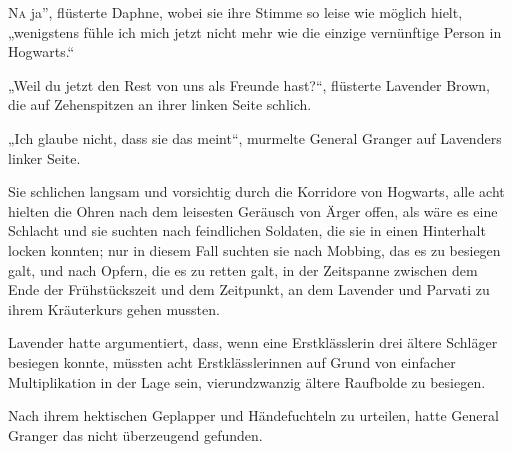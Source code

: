
\lettrine[ante=„]{N}{a} ja”, flüsterte Daphne, wobei sie ihre Stimme so leise wie möglich hielt, „wenigstens fühle ich mich jetzt nicht mehr wie die einzige vernünftige Person in Hogwarts.“

„Weil du jetzt den Rest von uns als Freunde hast?“, flüsterte Lavender Brown, die auf Zehenspitzen an ihrer linken Seite schlich.

„Ich glaube nicht, dass sie das meint“, murmelte General Granger auf Lavenders linker Seite.

Sie schlichen langsam und vorsichtig durch die Korridore von Hogwarts, alle acht hielten die Ohren nach dem leisesten Geräusch von Ärger offen, als wäre es eine Schlacht und sie suchten nach feindlichen Soldaten, die sie in einen Hinterhalt locken konnten; nur in diesem Fall suchten sie nach Mobbing, das es zu besiegen galt, und nach Opfern, die es zu retten galt, in der Zeitspanne zwischen dem Ende der Frühstückszeit und dem Zeitpunkt, an dem Lavender und Parvati zu ihrem Kräuterkurs gehen mussten.

Lavender hatte argumentiert, dass, wenn eine Erstklässlerin drei ältere Schläger besiegen konnte, müssten acht Erstklässlerinnen auf Grund von einfacher Multiplikation in der Lage sein, vierundzwanzig ältere Raufbolde zu besiegen.

Nach ihrem hektischen Geplapper und Händefuchteln zu urteilen, hatte General Granger das nicht überzeugend gefunden.


